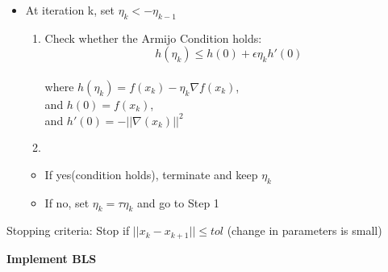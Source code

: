 \documentclass[
  letterpaper,
  DIV=11,
  numbers=noendperiod]{scrartcl}
\providecommand{\tightlist}{%
  \setlength{\itemsep}{0pt}\setlength{\parskip}{0pt}}\usepackage{longtable,booktabs,array}
\begin{document}
\begin{itemize}
\tightlist
\item
  At iteration k, set \(η_k <- η_{k-1}\)

  \begin{enumerate}
  \def\labelenumi{\arabic{enumi}.}
  \item
    Check whether the Armijo Condition holds: \[
    h(η_k) ≤ h(0) + ϵη_kh'(0)
    \]\\
    where \(h(η_k) = f(x_k) − η_k ∇f(x_k)\),\\
    and \(h(0) = f(x_k)\),\\
    and \(h'(0) = -||\nabla (x_k)||^2\)
  \item
  \end{enumerate}

  \begin{itemize}
  \tightlist
  \item
    If yes(condition holds), terminate and keep \(η_k\)
  \item
    If no, set \(η_k = τη_k\) and go to Step 1
  \end{itemize}
\end{itemize}

Stopping criteria: Stop if \(||x_k - x_{k+1}|| ≤ tol\) (change in
parameters is small)

\textbf{Implement BLS}
\end{document}
